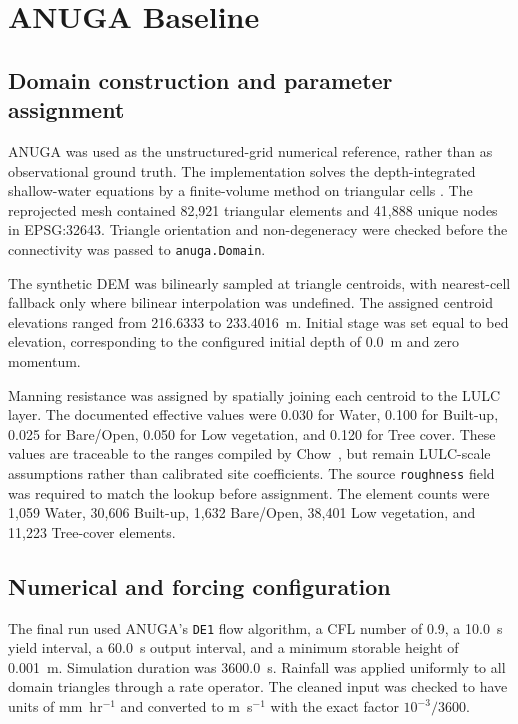 \section{ANUGA Baseline}
\label{sec:anuga-baseline}

\subsection{Domain construction and parameter assignment}

ANUGA was used as the unstructured-grid numerical reference, rather than as
observational ground truth.  The implementation solves the depth-integrated
shallow-water equations by a finite-volume method on triangular cells
\cite{MungkasiRoberts2012}.  The reprojected mesh contained 82,921 triangular
elements and 41,888 unique nodes in EPSG:32643.  Triangle orientation and
non-degeneracy were checked before the connectivity was passed to
\texttt{anuga.Domain}.

The synthetic DEM was bilinearly sampled at triangle centroids, with
nearest-cell fallback only where bilinear interpolation was undefined.  The
assigned centroid elevations ranged from 216.6333 to 233.4016~m.  Initial
stage was set equal to bed elevation, corresponding to the configured initial
depth of 0.0~m and zero momentum.

Manning resistance was assigned by spatially joining each centroid to the LULC
layer.  The documented effective values were 0.030 for Water, 0.100 for
Built-up, 0.025 for Bare/Open, 0.050 for Low vegetation, and 0.120 for Tree
cover.  These values are traceable to the ranges compiled by
Chow~\cite{Chow1959}, but remain LULC-scale assumptions rather than calibrated
site coefficients.  The source \texttt{roughness} field was required to match
the lookup before assignment.  The element counts were 1,059 Water, 30,606
Built-up, 1,632 Bare/Open, 38,401 Low vegetation, and 11,223 Tree-cover
elements.

\subsection{Numerical and forcing configuration}

The final run used ANUGA's \texttt{DE1} flow algorithm, a CFL number of 0.9,
a 10.0~s yield interval, a 60.0~s output interval, and a minimum storable
height of 0.001~m.  Simulation duration was 3600.0~s.  Rainfall was applied
uniformly to all domain triangles through a rate operator.  The cleaned input
was checked to have units of mm~hr\(^{-1}\) and converted to m~s\(^{-1}\)
with the exact factor \(10^{-3}/3600\).

